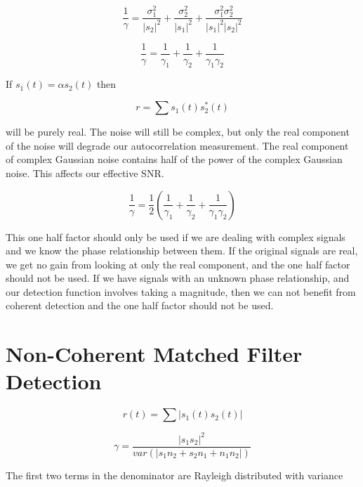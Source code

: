 \documentclass[11pt]{article}
\begin{document}
\begin{equation}
\frac{1}{\gamma}
=
\frac{\sigma_1^2}{|s_2|^2}
+
\frac{\sigma^2_2}{|s_1|^2}
+
\frac{\sigma_1^2 \sigma^2_2}{|s_1|^2 |s_2|^2}
\end{equation}

\begin{equation}
\boxed{
\frac{1}{\gamma}
=
\frac{1}{\gamma_1}
+
\frac{1}{\gamma_2}
+
\frac{1}{\gamma_1 \gamma_2}
}
\end{equation}

If $s_1(t) = \alpha s_2(t)$ then

\begin{equation}
r = \sum s_1(t)s^{*}_2(t)
\end{equation}

will be purely real. The noise will still be complex, but only the real component of the noise will degrade our autocorrelation measurement. The real component of complex Gaussian noise contains half of the power of the complex Gaussian noise. This affects our effective SNR.

\begin{equation}
\boxed{
\frac{1}{\gamma}
=
\frac{1}{2}
\left(
\frac{1}{\gamma_1}
+
\frac{1}{\gamma_2}
+
\frac{1}{\gamma_1 \gamma_2}
\right)
}
\end{equation}

This one half factor should only be used if we are dealing with complex signals and we know the phase relationship between them. If the original signals are real, we get no gain from looking at only the real component, and the one half factor should not be used. If we have signals with an unknown phase relationship, and our detection function involves taking a magnitude, then we can not benefit from coherent detection and the one half factor should not be used.

\section{Non-Coherent Matched Filter Detection}

\begin{equation}
r(t) = \sum |s_1(t)s_2(t)|
\end{equation}

\begin{equation}
\gamma = \frac{|s_1 s_2|^2}{var(|s_1 n_2 + s_2 n_1 + n_1 n_2|)}
\end{equation}


The first two terms in the denominator are Rayleigh distributed with variance
\end{document}
